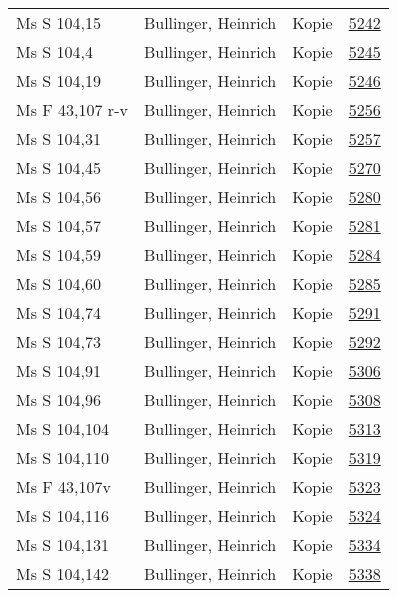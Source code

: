 \documentclass[10pt,a4paper,landscape]{report}
\begin{document}
\begin{longtable}{p{16cm}p{4cm}lr}
Ms S 104,15	&	Bullinger, Heinrich	&	Kopie	&	\href{http://130.60.24.72/assignment/5242}{5242}\\
Ms S 104,4	&	Bullinger, Heinrich	&	Kopie	&	\href{http://130.60.24.72/assignment/5245}{5245}\\
Ms S 104,19	&	Bullinger, Heinrich	&	Kopie	&	\href{http://130.60.24.72/assignment/5246}{5246}\\
Ms F 43,107 r-v	&	Bullinger, Heinrich	&	Kopie	&	\href{http://130.60.24.72/assignment/5256}{5256}\\
Ms S 104,31	&	Bullinger, Heinrich	&	Kopie	&	\href{http://130.60.24.72/assignment/5257}{5257}\\
Ms S 104,45	&	Bullinger, Heinrich	&	Kopie	&	\href{http://130.60.24.72/assignment/5270}{5270}\\
Ms S 104,56	&	Bullinger, Heinrich	&	Kopie	&	\href{http://130.60.24.72/assignment/5280}{5280}\\
Ms S 104,57	&	Bullinger, Heinrich	&	Kopie	&	\href{http://130.60.24.72/assignment/5281}{5281}\\
Ms S 104,59	&	Bullinger, Heinrich	&	Kopie	&	\href{http://130.60.24.72/assignment/5284}{5284}\\
Ms S 104,60	&	Bullinger, Heinrich	&	Kopie	&	\href{http://130.60.24.72/assignment/5285}{5285}\\
Ms S 104,74	&	Bullinger, Heinrich	&	Kopie	&	\href{http://130.60.24.72/assignment/5291}{5291}\\
Ms S 104,73	&	Bullinger, Heinrich	&	Kopie	&	\href{http://130.60.24.72/assignment/5292}{5292}\\
Ms S 104,91	&	Bullinger, Heinrich	&	Kopie	&	\href{http://130.60.24.72/assignment/5306}{5306}\\
Ms S 104,96	&	Bullinger, Heinrich	&	Kopie	&	\href{http://130.60.24.72/assignment/5308}{5308}\\
Ms S 104,104	&	Bullinger, Heinrich	&	Kopie	&	\href{http://130.60.24.72/assignment/5313}{5313}\\
Ms S 104,110	&	Bullinger, Heinrich	&	Kopie	&	\href{http://130.60.24.72/assignment/5319}{5319}\\
Ms F 43,107v	&	Bullinger, Heinrich	&	Kopie	&	\href{http://130.60.24.72/assignment/5323}{5323}\\
Ms S 104,116	&	Bullinger, Heinrich	&	Kopie	&	\href{http://130.60.24.72/assignment/5324}{5324}\\
Ms S 104,131	&	Bullinger, Heinrich	&	Kopie	&	\href{http://130.60.24.72/assignment/5334}{5334}\\
Ms S 104,142	&	Bullinger, Heinrich	&	Kopie	&	\href{http://130.60.24.72/assignment/5338}{5338}\\

\end{longtable}
\end{document}
